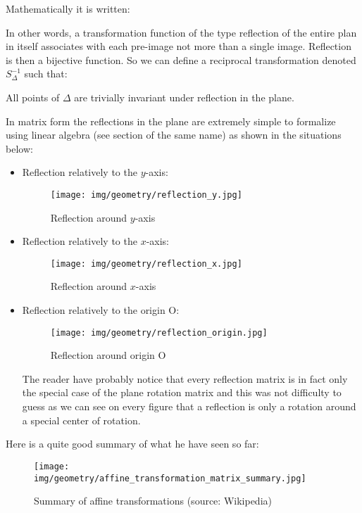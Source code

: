 	Mathematically it is written:
	
	In other words, a transformation function of the type reflection of the entire plan in itself associates with each pre-image not more than a single image. Reflection is then a bijective function. So we can define a reciprocal transformation denoted $S_\Delta^{-1}$ such that:
	
	\begin{tcolorbox}[title=Remark,colframe=black,arc=10pt]
	All points  of $\Delta$ are trivially invariant under reflection in the plane.
	\end{tcolorbox}
	In matrix form the reflections in the plane are extremely simple to formalize using linear algebra (see section of the same name) as shown in the situations below:
	\begin{itemize}
		\item Reflection relatively to the $y$-axis:
		
		\begin{figure}[H]
			\centering
			\texttt{[image: img/geometry/reflection\_y.jpg]}
			\caption{Reflection around $y$-axis}
		\end{figure}

		\item Reflection relatively to the $x$-axis:
		
		\begin{figure}[H]
			\centering
			\texttt{[image: img/geometry/reflection\_x.jpg]}
			\caption{Reflection around $x$-axis}
		\end{figure}


		\item Reflection relatively to the origin O:
		
		\begin{figure}[H]
			\centering
			\texttt{[image: img/geometry/reflection\_origin.jpg]}
			\caption{Reflection around origin O}
		\end{figure}
		The reader have probably notice that every reflection matrix is in fact only the special case of the plane rotation matrix and this was not difficulty to guess as we can see on every figure that a reflection is only a rotation around a special center of rotation.
		
	\end{itemize}
	
	Here is a quite good summary of what he have seen so far:
	\begin{figure}[H]
		\centering
		\texttt{[image: img/geometry/affine\_transformation\_matrix\_summary.jpg]}
		\caption{Summary of affine transformations (source: Wikipedia)}
	\end{figure}
	
